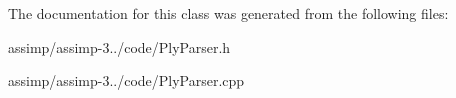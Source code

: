 The documentation for this class was generated from the following files\+:\begin{DoxyCompactItemize}
\item 
assimp/assimp-\/3../code/Ply\+Parser.\+h\item 
assimp/assimp-\/3../code/Ply\+Parser.\+cpp\end{DoxyCompactItemize}
